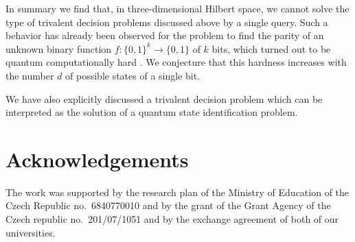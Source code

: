 \documentclass{article}
\begin{document}
In summary we find that, in three-dimensional Hilbert space, we cannot solve the type of trivalent decision problems
discussed above by a single query.
Such a behavior has already been observed for the problem to find the
parity of an unknown binary function $f:\{0,1\}^k \rightarrow \{0,1\}$ of $k$ bits,
which turned out to be quantum computationally hard
\cite{Farhi-98,bbcmw-01,Miao-2001,orus-04,stadelhofer-05}.
We conjecture that this hardness increases with the number $d$ of possible states of a single bit.

We have also explicitly discussed a trivalent decision problem which can be interpreted as the solution of a quantum
state identification problem.



\section *{Acknowledgements}


The work was supported by the research plan of the Ministry of Education of
the Czech Republic no.~6840770010 and by the grant of the Grant Agency of
the Czech republic no.~201/07/1051 and by the exchange agreement
of both of our universities.


%
%
%
\end{document}
